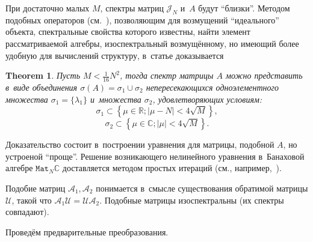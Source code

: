\documentclass[14pt,a4paper]{extarticle}
\newtheorem{thm}{Theorem}
\theoremstyle{definition}
\begin{document}
При достаточно малых \( M \),
 спектры матриц \( \mathcal{J}_N \) и~\( A \) будут ``близки''.
Методом подобных операторов (см.~\cite{baskakov1986theorem,baskakov1987theorem,baskakov1994spectral,baskakov2002splitting}),
 позволяющим для возмущений ``идеального'' объекта, спектральные свойства которого известны,
 найти элемент рассматриваемой алгебры, изоспектральный возмущ\"енному,
 но имеющий более удобную для вычислений структуру,
 в~статье доказывается
\begin{thm}\label{nk:thm:almost-all-ones}
    Пусть \( M < \frac{1}{16} N^2 \),
    тогда спектр матрицы \( A \) можно представить в~виде
    объединения \( \sigma\left(A\right) = \sigma_1 \cup \sigma_2 \)
    непересекающихся
    одноэлементного множества \( \sigma_1=\{\lambda_1\} \)
    и~множества \( \sigma_2 \), удовлетворяющих условиям:
    \[ \sigma_1 \subset \left\{ \mu\in\mathbb{R}; \lvert \mu - N \rvert < 4\sqrt{M} \right\}, \]
    \[ \sigma_2 \subset \left\{ \mu\in\mathbb{C}; \lvert \mu \rvert < 4\sqrt{M} \right\}. \]
\end{thm}

Доказательство состоит в~построении уравнения для матрицы, подобной \( A \),
 но устроеной ``проще''. Решение возникающего нелинейного уравнения
 в~Банаховой алгебре \( \mathtt{Mat}_N\mathbb{C} \)
 доставляется методом простых итераций (см., например,~\cite{baskakov1986theorem,baskakov1987theorem,baskakov1994spectral,baskakov2002splitting}).

Подобие матриц \( \mathcal{A}_1, \mathcal{A}_2 \)
 понимается в~смысле существования обратимой матрицы \( \mathcal{U} \),
 такой что \( \mathcal{A}_1 \mathcal{U} = \mathcal{U} \mathcal{A}_2 \).
Подобные матрицы изоспектральны (их спектры совпадают).

Провед\"ем предварительные преобразования.
\end{document}
